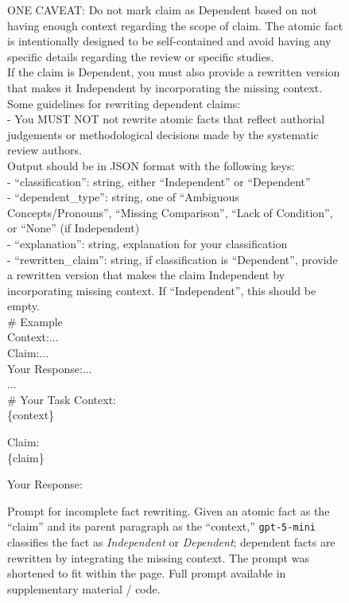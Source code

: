\documentclass{article}
\begin{document}
\begin{figure}[t]
\begin{small}
\begin{tcolorbox}[
    colback=gray!5,
    colframe=black,
    width=\linewidth,
    arc=2mm,
    boxrule=0.5pt,
    title=\textbf{Atomic Fact Generation (Step 3): Incomplete Fact Rewriting Prompt}
]
ONE CAVEAT: Do not mark claim as Dependent based on not having enough context regarding the scope of claim. The atomic fact is intentionally designed to be self-contained and avoid having any specific details regarding the review or specific studies.\\

If the claim is Dependent, you must also provide a rewritten version that makes it Independent by incorporating the missing context. Some guidelines for rewriting dependent claims:\\
- You MUST NOT not rewrite atomic facts that reflect authorial judgements or methodological decisions made by the systematic review authors.\\

Output should be in JSON format with the following keys:\\
- ``classification'': string, either ``Independent'' or ``Dependent''\\
- ``dependent\_type'': string, one of ``Ambiguous Concepts/Pronouns'', ``Missing Comparison'', ``Lack of Condition'', or ``None'' (if Independent)\\
- ``explanation'': string, explanation for your classification\\
- ``rewritten\_claim'': string, if classification is ``Dependent'', provide a rewritten version that makes the claim Independent by incorporating missing context. If ``Independent'', this should be empty. \\

\# Example\\
Context:...\\
Claim:...\\
Your Response:...\\
...\\

\# Your Task
Context:\\
\{context\}

Claim:\\
\{claim\}

Your Response:
\end{tcolorbox}

\caption{Prompt for incomplete fact rewriting. Given an atomic fact as the ``claim'' and its parent paragraph as the ``context,'' \texttt{gpt-5-mini} classifies the fact as \textit{Independent} or \textit{Dependent}; dependent facts are rewritten by integrating the missing context. The prompt was shortened to fit within the page. Full prompt available in supplementary material / code.}
\label{fig:incomplete-fact-prompt}
\end{small}
\end{figure}
\end{document}
